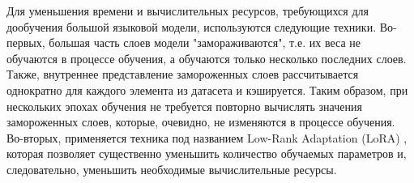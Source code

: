 Для уменьшения времени и вычислительных ресурсов, требующихся для дообучения большой языковой модели, используются следующие техники. Во-первых, большая часть слоев модели "замораживаются", т.е. их веса не обучаются в процессе обучения, а обучаются только несколько последних слоев. Также, внутреннее представление замороженных слоев рассчитывается однократно для каждого элемента из датасета и кэшируется. Таким образом, при нескольких эпохах обучения не требуется повторно вычислять значения замороженных слоев, которые, очевидно, не изменяются в процессе обучения. Во-вторых, применяется техника под названием Low-Rank Adaptation (LoRA) \cite{lora}, которая позволяет существенно уменьшить количество обучаемых параметров и, следовательно, уменьшить необходимые вычислительные ресурсы.

